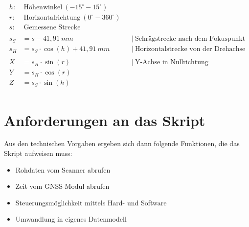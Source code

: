 \documentclass[a4paper,12pt,bibliography=totoc, listof=totoc,titlepage,pointlessnumbers]{scrreprt}
\begin{document}
\begin{equation}
\begin{aligned}
h:&~\text{H\"{o}henwinkel}~(-15^\circ - 15^\circ) \\
r:&~\text{Horizontalrichtung}~(0^\circ - 360^\circ) \\
s:&~\text{Gemessene~Strecke} \\
\\
s_S &= s - 41,91~mm    		 && \left|\  \text{Schr\"{a}gstrecke nach dem Fokuspunkt} \right. \\
s_H &= s_S \cdot \cos(h) + 41,91~mm  && \left|\  \text{Horizontalstrecke von der Drehachse} \right. \\
\\
X &= s_H \cdot \sin(r) && \left|\  \text{Y-Achse in Nullrichtung} \right. \\
Y &= s_H \cdot \cos(r) \\
Z &= s_S \cdot \sin(h) \\
\end{aligned}
\label{equ:koordinaten}
\end{equation}

\section{Anforderungen an das Skript}
\label{s:anforderungen}
Aus den technischen Vorgaben ergeben sich dann folgende Funktionen, die das Skript aufweisen muss:
\begin{itemize}
 \item Rohdaten vom Scanner abrufen
 \item Zeit vom GNSS-Modul abrufen
 \item Steuerungsmöglichkeit mittels Hard- und Software
 \item Umwandlung in eigenes Datenmodell
\end{itemize}
\end{document}
